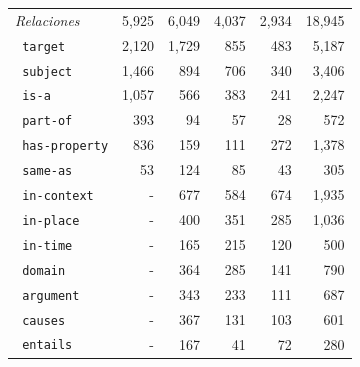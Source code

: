 \begin{table}[tpb]
{\begin{tabular}{lrrrrr}
            \midrule
            \textit{Relaciones}    & 5,925                                          & 6,049         & 4,037         & 2,934         & 18,945         \\
            \texttt{ target}       & 2,120                                          & 1,729         & 855           & 483           & 5,187          \\
            \texttt{ subject}      & 1,466                                          & 894           & 706           & 340           & 3,406          \\
            \texttt{ is-a}         & 1,057                                          & 566           & 383           & 241           & 2,247          \\
            \texttt{ part-of}      & 393                                            & 94            & 57            & 28            & 572            \\
            \texttt{ has-property} & 836                                            & 159           & 111           & 272           & 1,378          \\
            \texttt{ same-as}      & 53                                             & 124           & 85            & 43            & 305            \\
            \texttt{ in-context}   & -                                              & 677           & 584           & 674           & 1,935          \\
            \texttt{ in-place}     & -                                              & 400           & 351           & 285           & 1,036          \\
            \texttt{ in-time}      & -                                              & 165           & 215           & 120           & 500            \\
            \texttt{ domain}       & -                                              & 364           & 285           & 141           & 790            \\
            \texttt{ argument}     & -                                              & 343           & 233           & 111           & 687            \\
            \texttt{ causes}       & -                                              & 367           & 131           & 103           & 601            \\
            \texttt{ entails}      & -                                              & 167           & 41            & 72            & 280            \\

\end{tabular}}
\end{table}
